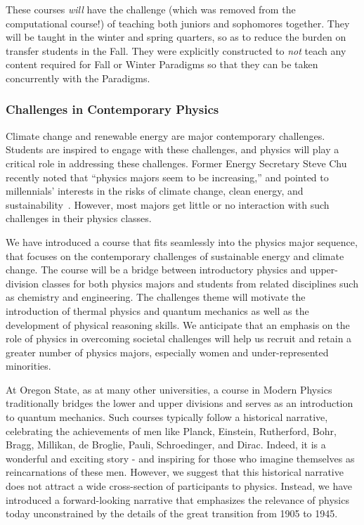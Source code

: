 \documentclass[english,aps,pra,reprint,noshowpacs,superscriptaddress]{revtex4-1}
\begin{document}
These courses \emph{will} have the challenge (which was removed from
the computational course!) of teaching both juniors and sophomores
together.  They will be taught in the winter and spring quarters, so
as to reduce the burden on transfer students in the Fall.  They were
explicitly constructed to \emph{not} teach any content required for
Fall or Winter Paradigms so that they can be taken concurrently with
the Paradigms.

\subsubsection{Challenges in Contemporary Physics}
Climate change and renewable energy are major contemporary
challenges. Students are inspired to engage with these challenges, and
physics will play a critical role in addressing these challenges.
Former Energy Secretary Steve Chu recently noted that ``physics majors
seem to be increasing,'' and pointed to millennials' interests in the
risks of climate change, clean energy, and
sustainability~\cite{kramer2016gathering}.  However, most majors get
little or no interaction with such challenges in their physics
classes.

We have introduced a course that fits seamlessly into the physics
major sequence, that focuses on the contemporary challenges of
sustainable energy and climate change. The course will be a bridge
between introductory physics and upper-division classes for both
physics majors and students from related disciplines such as chemistry
and engineering. The challenges theme will motivate the introduction
of thermal physics and quantum mechanics as well as the development of
physical reasoning skills. We anticipate that an emphasis on the role
of physics in overcoming societal challenges will help us recruit and
retain a greater number of physics majors, especially women and
under-represented minorities.

At Oregon State, as at many other universities, a course in Modern
Physics traditionally bridges the lower and upper divisions and serves
as an introduction to quantum mechanics. Such courses typically follow
a historical narrative, celebrating the achievements of men like
Planck, Einstein, Rutherford, Bohr, Bragg, Millikan, de Broglie,
Pauli, Schroedinger, and Dirac. Indeed, it is a wonderful and exciting
story - and inspiring for those who imagine themselves as
reincarnations of these men. However, we suggest that this historical
narrative does not attract a wide cross-section of participants to
physics. Instead, we have introduced a forward-looking narrative that
emphasizes the relevance of physics today unconstrained by the details
of the great transition from 1905 to 1945.
\end{document}
